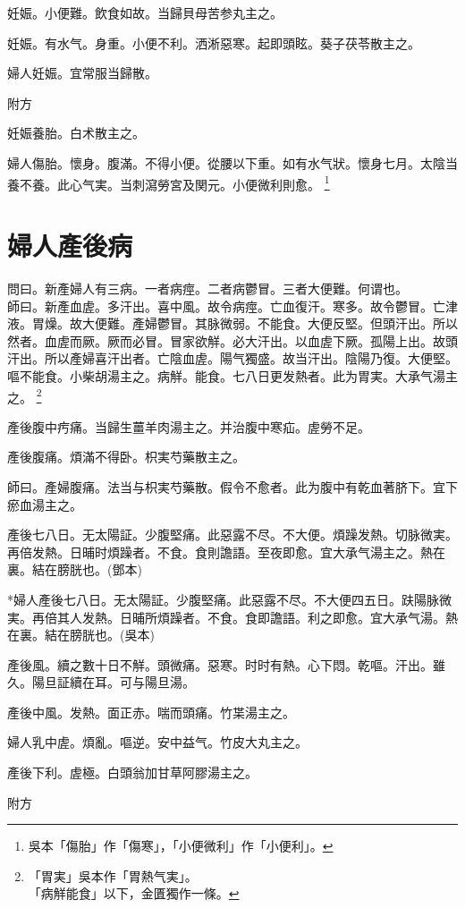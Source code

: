 \documentclass[12pt,twoside,UTF8,b5paper]{ctexbook}
\begin{document}
妊娠。小便難。飲食如故。当歸貝母苦参丸主之。

妊娠。有水气。身重。小便不利。洒淅惡寒。起即頭眩。葵子茯苓散主之。

婦人妊娠。宜常服当歸散。

附方

妊娠養胎。白术散主之。

婦人傷胎。懷身。腹滿。不得小便。從腰以下重。如有水气狀。懷身七月。太陰当養不養。此心气実。当刺瀉勞宮及関元。小便{微}利則愈。
	\footnote{吳本「傷胎」作「傷寒」，「小便微利」作「小便利」。}

\chapter{婦人產後病}

問曰。新產婦人有三病。一者病痙。二者病鬱冒。三者大便難。何谓也。\\
師曰。新產血虗。多汗出。喜中風。故令病痙。亡血復汗。寒多。故令鬱冒。亡津液。胃燥。故大便難。產婦鬱冒。其脉微弱。不能食。大便反堅。但頭汗出。所以然者。血虗而厥。厥而必冒。冒家欲觧。必大汗出。以血虗下厥。孤陽上出。故頭汗出。所以產婦喜汗出者。亡陰血虗。陽气獨盛。故当汗出。陰陽乃復。大便堅。嘔不能食。小柴胡湯主之。病觧。能食。七八日更发熱者。此为胃実。大承气湯主之。
	\footnote{「胃実」吳本作「胃熱气実」。\\「病觧能食」以下，金匱獨作一條。}

產後腹中㽲痛。当歸生薑羊肉湯主之。并治腹中寒疝。虗勞不足。

產後腹痛。煩滿不得卧。枳実芍藥散主之。

師曰。產婦腹痛。法当与枳実芍藥散。假令不愈者。此为腹中有乾血著脐下。宜下瘀血湯主之。

產後七八日。无太陽証。少腹堅痛。此惡露不尽。不大便。煩躁发熱。切脉微実。再倍发熱。日晡时煩躁者。不食。食則譫語。至夜即愈。宜大承气湯主之。熱在裏。結在膀胱也。(鄧本)

*婦人產後七八日。无太陽証。少腹堅痛。此惡露不尽。不大便四五日。趺陽脉微実。再倍其人发熱。日晡所煩躁者。不食。食即譫語。利之即愈。宜大承气湯。熱在裏。結在膀胱也。(吳本)

產後風。續之數十日不觧。頭微痛。惡寒。时时有熱。心下悶。乾嘔。汗出。雖久。陽旦証續在耳。可与陽旦湯。

產後中風。发熱。面正赤。喘而頭痛。竹枼湯主之。

婦人乳中虗。煩亂。嘔逆。安中益气。竹皮大丸主之。

產後下利。虗極。白頭翁加甘草阿膠湯主之。

附方
\end{document}
